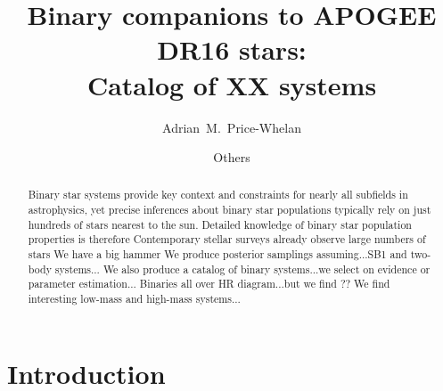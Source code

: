 \documentclass[modern]{aastex63}
\begin{document}
\sloppy\sloppypar\raggedbottom\frenchspacing %

\title{Binary companions to APOGEE DR16 stars: \\
       Catalog of XX systems}

\author[0000-0003-0872-7098]{Adrian~M.~Price-Whelan}



\author{Others}

\begin{abstract}
Binary star systems provide key context and constraints for nearly all subfields in astrophysics, yet precise inferences about binary star populations typically rely on just hundreds of stars nearest to the sun.
Detailed knowledge of binary star population properties is therefore
Contemporary stellar surveys already observe large numbers of stars
We have a big hammer
We produce posterior samplings assuming...SB1 and two-body systems...
We also produce a catalog of binary systems...we select on evidence or parameter estimation...
Binaries all over HR diagram...but we find ??
We find interesting low-mass and high-mass systems...
\end{abstract}

\keywords{}


\section{Introduction} \label{sec:intro}
\end{document}
